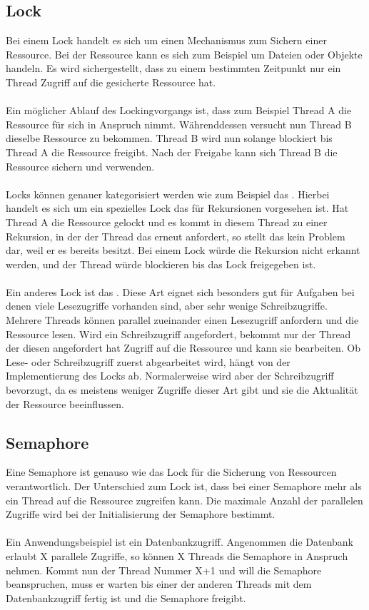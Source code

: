 \subsection{Lock}
Bei einem Lock handelt es sich um einen Mechanismus zum Sichern einer Ressource. Bei der Ressource kann es sich zum Beispiel um Dateien oder Objekte handeln. Es wird sichergestellt, dass zu einem bestimmten Zeitpunkt nur ein Thread Zugriff auf die gesicherte Ressource hat.\cite{30}
\\
\\
Ein möglicher Ablauf des Lockingvorgangs ist, dass zum Beispiel Thread A die Ressource für sich in Anspruch nimmt. Währenddessen versucht nun Thread B dieselbe Ressource zu bekommen. Thread B wird nun solange blockiert bis Thread A die Ressource freigibt. Nach der Freigabe kann sich Thread B die Ressource sichern und verwenden.
\\
\\
Locks können genauer kategorisiert werden wie zum Beispiel das . Hierbei handelt es sich um ein spezielles Lock das für Rekursionen vorgesehen ist. Hat Thread A die Ressource gelockt und es kommt in diesem Thread zu einer Rekursion, in der der Thread das  erneut anfordert, so stellt das kein Problem dar, weil er es bereits besitzt. Bei einem Lock würde die Rekursion nicht erkannt werden, und der Thread würde blockieren bis das Lock freigegeben ist.\cite{31}
\\
\\
Ein anderes Lock ist das . Diese Art eignet sich besonders gut für Aufgaben bei denen viele Lesezugriffe vorhanden sind, aber sehr wenige Schreibzugriffe. Mehrere Threads können parallel zueinander einen Lesezugriff anfordern und die Ressource lesen. Wird ein Schreibzugriff angefordert, bekommt nur der Thread der diesen angefordert hat Zugriff auf die Ressource und kann sie bearbeiten. Ob Lese- oder Schreibzugriff zuerst abgearbeitet wird, hängt von der Implementierung des Locks ab. Normalerweise wird aber der Schreibzugriff bevorzugt, da es meistens weniger Zugriffe dieser Art gibt und sie die Aktualität der Ressource beeinflussen.\cite{32}

\subsection{Semaphore}
Eine Semaphore ist genauso wie das Lock für die Sicherung von Ressourcen verantwortlich. Der Unterschied zum Lock ist, dass bei einer Semaphore mehr als ein Thread auf die Ressource zugreifen kann. Die maximale Anzahl der parallelen Zugriffe wird bei der Initialisierung der Semaphore bestimmt.\cite{33}
\\
\\
Ein Anwendungsbeispiel ist ein Datenbankzugriff. Angenommen die Datenbank erlaubt X parallele Zugriffe, so können X Threads die Semaphore in Anspruch nehmen. Kommt nun der Thread Nummer X+1 und will die Semaphore beanspruchen, muss er warten bis einer der anderen Threads mit dem Datenbankzugriff fertig ist und die Semaphore freigibt.


